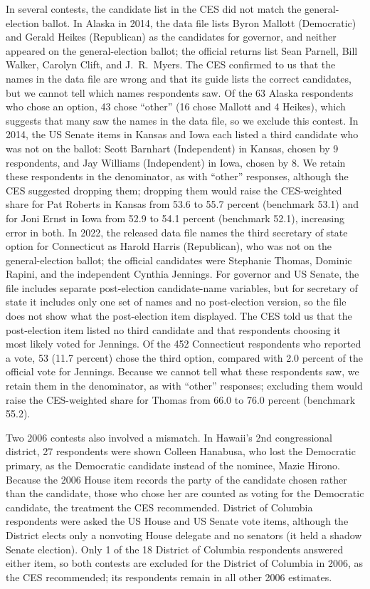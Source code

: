 \documentclass[12pt]{article}
\begin{document}
In several contests, the candidate list in the CES did not match the general-election ballot. In Alaska in 2014, the data file lists Byron Mallott (Democratic) and Gerald Heikes (Republican) as the candidates for governor, and neither appeared on the general-election ballot; the official returns list Sean Parnell, Bill Walker, Carolyn Clift, and J.\ R.\ Myers. The CES confirmed to us that the names in the data file are wrong and that its guide lists the correct candidates, but we cannot tell which names respondents saw. Of the 63 Alaska respondents who chose an option, 43 chose ``other'' (16 chose Mallott and 4 Heikes), which suggests that many saw the names in the data file, so we exclude this contest. In 2014, the US Senate items in Kansas and Iowa each listed a third candidate who was not on the ballot: Scott Barnhart (Independent) in Kansas, chosen by 9 respondents, and Jay Williams (Independent) in Iowa, chosen by 8. We retain these respondents in the denominator, as with ``other'' responses, although the CES suggested dropping them; dropping them would raise the CES-weighted share for Pat Roberts in Kansas from 53.6 to 55.7 percent (benchmark 53.1) and for Joni Ernst in Iowa from 52.9 to 54.1 percent (benchmark 52.1), increasing error in both. In 2022, the released data file names the third secretary of state option for Connecticut as Harold Harris (Republican), who was not on the general-election ballot; the official candidates were Stephanie Thomas, Dominic Rapini, and the independent Cynthia Jennings. For governor and US Senate, the file includes separate post-election candidate-name variables, but for secretary of state it includes only one set of names and no post-election version, so the file does not show what the post-election item displayed. The CES told us that the post-election item listed no third candidate and that respondents choosing it most likely voted for Jennings. Of the 452 Connecticut respondents who reported a vote, 53 (11.7 percent) chose the third option, compared with 2.0 percent of the official vote for Jennings. Because we cannot tell what these respondents saw, we retain them in the denominator, as with ``other'' responses; excluding them would raise the CES-weighted share for Thomas from 66.0 to 76.0 percent (benchmark 55.2).

Two 2006 contests also involved a mismatch. In Hawaii's 2nd congressional district, 27 respondents were shown Colleen Hanabusa, who lost the Democratic primary, as the Democratic candidate instead of the nominee, Mazie Hirono. Because the 2006 House item records the party of the candidate chosen rather than the candidate, those who chose her are counted as voting for the Democratic candidate, the treatment the CES recommended. District of Columbia respondents were asked the US House and US Senate vote items, although the District elects only a nonvoting House delegate and no senators (it held a shadow Senate election). Only 1 of the 18 District of Columbia respondents answered either item, so both contests are excluded for the District of Columbia in 2006, as the CES recommended; its respondents remain in all other 2006 estimates.
\end{document}
